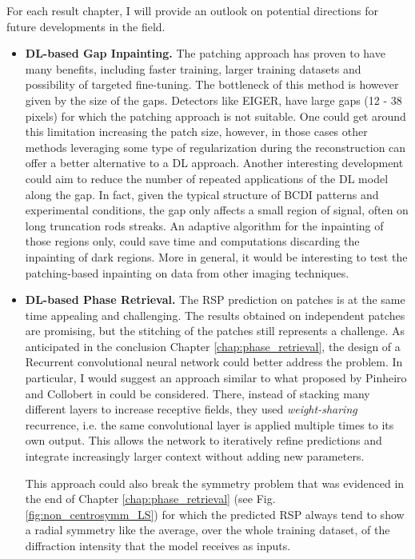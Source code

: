 For each result chapter, I will provide an outlook on potential directions for future developments in the field.

\begin{itemize}
    \item \textbf{DL-based Gap Inpainting.} The patching approach has proven to have many benefits, including faster training, 
    larger training datasets and possibility of targeted fine-tuning. The bottleneck of this method is however given by 
    the size of the gaps. Detectors like EIGER, have large gaps (12 - 38 pixels) for which the patching approach is not 
    suitable. One could get around this limitation increasing the patch size, however, in those cases other methods 
    leveraging some type of regularization during the reconstruction \cite{Chushkin2025} can offer a better alternative 
    to a DL approach. 
    Another interesting development could aim to reduce the number of repeated applications of the DL model along the gap. 
    In fact, given the typical structure of BCDI patterns and experimental conditions, the gap only affects a small region 
    of signal, often on long truncation rods streaks. An adaptive algorithm for the inpainting of those regions only, could 
    save time and computations discarding the inpainting of dark regions.
    More in general, it would be interesting to test the patching-based inpainting on data from other imaging techniques.   
    
    \item \textbf{DL-based Phase Retrieval.} The RSP prediction on patches is at the same time appealing and challenging. 
    The results obtained on independent patches are promising, but the stitching of the patches still represents a 
    challenge. As anticipated in the conclusion Chapter \ref{chap:phase_retrieval}, the design of a Recurrent convolutional 
    neural network could better address the problem. In particular, I would suggest an approach similar to what proposed 
    by Pinheiro and Collobert in \cite{Pinheiro2014RecurrentCN} could be considered. 
    There, instead of stacking many different layers to increase receptive fields, they used \textit{weight-sharing} recurrence, 
    i.e. the same convolutional layer is applied multiple times to its own output. This allows the network to iteratively 
    refine predictions and integrate increasingly larger context without adding new parameters.
    
    This approach could also break the symmetry problem that was evidenced in the end of Chapter \ref{chap:phase_retrieval}
    (see Fig. \ref{fig:non_centrosymm_LS}) 
    for which the predicted RSP always tend to show a radial symmetry like the average, over the whole training dataset, 
    of the diffraction intensity that the model receives as inputs. 


\end{itemize}
